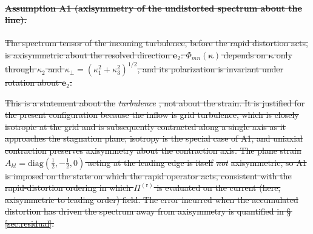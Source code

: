 \documentclass[lineno]{JFM-FLM_Au}
\providecommand{\DIFdel}[1]{{\protect\color{red}\sout{#1}}}                      %
\begin{document}
\paragraph{\DIFdel{Assumption A1 (axisymmetry of the undistorted spectrum about the
line).}} %
\addtocounter{paragraph}{-1}%
\DIFdel{The spectrum tensor of the incoming turbulence, before the rapid
distortion acts, is axisymmetric about the resolved direction $\boldsymbol{e}_2$:
$\Phi_{mn}(\boldsymbol{\kappa})$ depends on $\boldsymbol{\kappa}$ only through
$\kappa_2$ and $\kappa_\perp=(\kappa_1^2+\kappa_3^2)^{1/2}$, and its
polarization is invariant under rotation about $\boldsymbol{e}_2$.
}%

\DIFdel{This is a statement about the }\emph{\DIFdel{turbulence}}%
\DIFdel{, not about the strain. It is
justified for the present configuration because the inflow is grid turbulence,
which is closely isotropic at the grid and is subsequently contracted along a
single axis as it approaches the stagnation plane; isotropy is the special
case of A1, and uniaxial contraction preserves axisymmetry about the
contraction axis. The plane strain $A_{kl}=\mathrm{diag}(\tfrac12,-\tfrac12,0)$
acting at the leading edge is itself }\emph{\DIFdel{not}} %
\DIFdel{axisymmetric, so A1 is imposed
on the state on which the rapid operator acts, consistent with the
rapid-distortion ordering in which $\Pi^{(\mathrm r)}$ is evaluated on the
current (here, axisymmetric to leading order) field. The error incurred when
the accumulated distortion has driven the spectrum away from axisymmetry is
quantified in \S\,\ref{sec:residual}.
}%
\end{document}
